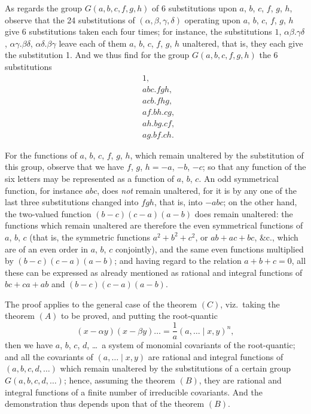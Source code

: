 \documentclass[11pt,a4paper]{book}
\begin{document}
As regards the group $G(a, b, c, f, g, h)$ of 6 substitutions upon $a$, $b$, $c$, $f$, $g$, $h$, observe that the 24 substitutions of $(\alpha, \beta, \gamma, \delta)$ operating upon $a$, $b$, $c$, $f$, $g$, $h$ give 6 substitutions taken each four times; for instance, the substitutions $1$, $\alpha\beta.\gamma\delta$, $\alpha\gamma.\beta\delta$, $\alpha\delta.\beta\gamma$ leave each of them $a$, $b$, $c$, $f$, $g$, $h$ unaltered, that is, they each give the substitution 1. And we thus find for the group $G(a, b, c, f, g, h)$ the 6 substitutions
\begin{align*}
&1,\\
&abc.fgh,\\
&acb.fhg,\\
&af.bh.cg,\\
&ah.bg.cf,\\
&ag.bf.ch.
\end{align*}

For the functions of $a$, $b$, $c$, $f$, $g$, $h$, which remain unaltered by the substitution of this group, observe that we have $f$, $g$, $h = -a$, $-b$, $-c$; so that any function of the six letters may be represented as a function of $a$, $b$, $c$. An odd symmetrical function, for instance $abc$, does \textit{not} remain unaltered, for it is by any one of the last three substitutions changed into $fgh$, that is, into $-abc$; on the other hand, the two-valued function $(b-c)(c-a)(a-b)$ does remain unaltered: the functions which remain unaltered are therefore the even symmetrical functions of $a$, $b$, $c$ (that is, the symmetric functions $a^2 + b^2 + c^2$, or $ab + ac + bc$, \&c., which are of an even order in $a$, $b$, $c$ conjointly), and the same even functions multiplied by $(b-c)(c-a)(a-b)$; and having regard to the relation $a + b + c = 0$, all these can be expressed as already mentioned as rational and integral functions of $bc + ca + ab$ and $(b-c)(c-a)(a-b)$.

The proof applies to the general case of the theorem $(C)$, viz.\ taking the theorem $(A)$ to be proved, and putting the root-quantic
\[
(x - \alpha y)(x - \beta y) \ldots = \frac{1}{a}(a, \ldots \mid x, y)^n,
\]
then we have $a$, $b$, $c$, $d$, \ldots\ a system of monomial covariants of the root-quantic; and all the covariants of $(a, \ldots \mid x, y)$ are rational and integral functions of $(a, b, c, d, \ldots)$ which remain unaltered by the substitutions of a certain group $G(a, b, c, d, \ldots)$; hence, assuming the theorem $(B)$, they are rational and integral functions of a finite number of irreducible covariants. And the demonstration thus depends upon that of the theorem $(B)$.
\end{document}
